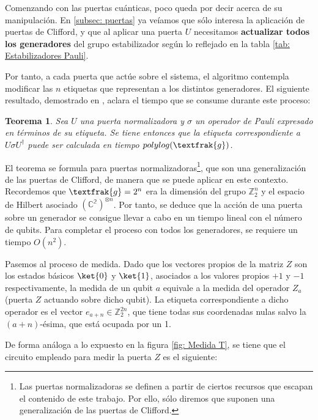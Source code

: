 \documentclass[11pt,a4paper,twoside,pdf]{article}
\numberwithin{equation}{section}
\newtheorem{theorem}{Teorema}
\begin{document}
 	\vspace{.35cm}
	
	Comenzando con las puertas cuánticas, poco queda por decir acerca de su manipulación. En \ref{subsec: puertas} ya veíamos que sólo interesa la aplicación de puertas de Clifford, y que al aplicar una puerta $U$ necesitamos \textbf{actualizar todos los generadores} del grupo estabilizador según lo reflejado en la tabla \ref{tab: Estabilizadores Pauli}.
	
	Por tanto, a cada puerta que actúe sobre el sistema, el algoritmo contempla modificar las $n$ etiquetas que representan a los distintos generadores. El siguiente resultado, demostrado en \cite{VandenNest}, aclara el tiempo que se consume durante este proceso:

		\begin{theorem}
			Sea $U$ una puerta normalizadora y $\sigma$ un operador de Pauli expresado en términos de su etiqueta. Se tiene entonces que la etiqueta correspondiente a $U\sigma U^\dagger$ puede ser calculada en tiempo $polylog(\textfrak{g})$.
		\end{theorem}
	
	El teorema se formula para puertas normalizadoras\footnote{Las puertas normalizadoras se definen a partir de ciertos recursos que escapan el contenido de este trabajo. Por ello, sólo diremos que suponen una generalización de las puertas de Clifford.}, que son una generalización de las puertas de Clifford, de manera que se puede aplicar en este contexto. Recordemos que $\textfrak{g}=2^n$ era la dimensión del grupo $\mathbb{Z}^n_2$ y el espacio de Hilbert asociado $\left( \mathbb{C^2}\right)^{\otimes n}$. Por tanto, se deduce que la acción de una puerta sobre un generador se consigue llevar a cabo en un tiempo lineal con el número de qubits. Para completar el proceso con todos los generadores, se requiere un tiempo $O(n^2)$.
	
	\vspace{0.5cm}
	
	Pasemos al proceso de medida. Dado que los vectores propios de la matriz $Z$ son los estados básicos $\ket{0}$ y $\ket{1}$, asociados a los valores propios $+1$ y $-1$ respectivamente, la medida de un qubit $a$ equivale a la medida del operador $Z_a$ (puerta $Z$ actuando sobre dicho qubit). La etiqueta correspondiente a dicho operador es el vector $e_{a+n}\in \mathbb{Z}_2^{2n}$, que tiene todas sus coordenadas nulas salvo la $(a+n)$-ésima, que está ocupada por un 1.
	
	De forma análoga a lo expuesto en la figura \ref{fig: Medida T}, se tiene que el circuito empleado para medir la puerta $Z$ es el siguiente:
	
\end{document}
